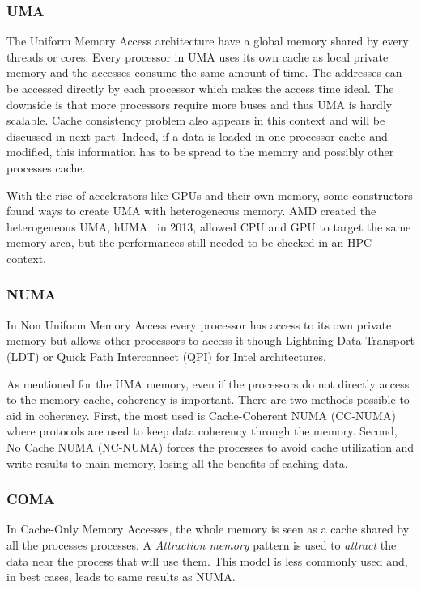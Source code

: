 \subsubsection{UMA}
The Uniform Memory Access architecture have a global memory shared by every threads or cores. 
Every processor in UMA uses its own cache as local private memory and the accesses consume the same amount of time.
The addresses can be accessed directly by each processor which makes the access time ideal. 
The downside is that more processors require more buses and thus UMA is hardly scalable. 
Cache consistency problem also appears in this context and will be discussed in next part.
Indeed, if a data is loaded in one processor cache and modified, this information has to be spread to the memory and possibly other processes cache. 

With the rise of accelerators like GPUs and their own memory, some constructors found ways to create UMA with heterogeneous memory.
AMD created the heterogeneous UMA, hUMA~\cite{rogers2013amd} in 2013, allowed CPU and GPU to target the same memory area, but the performances still needed to be checked in an HPC context.

\subsubsection{NUMA}
In Non Uniform Memory Access every processor has access to its own private memory but allows other processors to access it though Lightning Data Transport (LDT) or Quick Path Interconnect (QPI) for Intel architectures. 

As mentioned for the UMA memory, even if the processors do not directly access to the memory cache, coherency is important. 
There are two methods possible to aid in coherency.
First, the most used is Cache-Coherent NUMA (CC-NUMA) where protocols are used to keep data coherency through the memory. 
Second, No Cache NUMA (NC-NUMA) forces the processes to avoid cache utilization and write results to main memory, losing all the benefits of caching data. 

\subsubsection{COMA}
In Cache-Only Memory Accesses, the whole memory is seen as a cache shared by all the processes processes.
A \textit{Attraction memory} pattern is used to \textit{attract} the data near the process that will use them. 
This model is less commonly used and, in best cases, leads to same results as NUMA.

